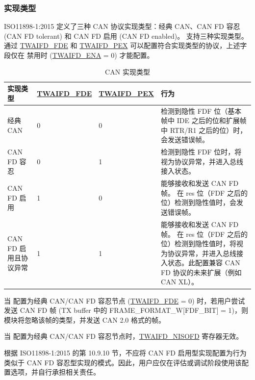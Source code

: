 \documentclass[main\_\_CN.tex]{subfiles}
\begin{document}
\subsubsection{实现类型}

ISO11898-1:2015 定义了三种 CAN 协议实现类型：经典 CAN、CAN FD 容忍 (CAN FD tolerant) 和 CAN FD 启用 (CAN FD enabled)。\modulename{} 支持三种实现类型。通过 \hyperref[fielddesc:TWAIFDFDE]{TWAIFD\_FDE} 和 \hyperref[fielddesc:TWAIFDPEX]{TWAIFD\_PEX} 可以配置符合实现类型的协议，上述字段仅在 \modulename{} 禁用时 (\hyperref[fielddesc:TWAIFDENA]{TWAIFD\_ENA} = 0) 才能配置。

\begin{table}[H]
    \centering
    \caption{CAN 实现类型}
    \label{tab:twai-func-can-implt-type}
    \begin{tabular}{ |m{2.5cm}|m{1.5cm}|m{1.5cm}|m{9.2cm}| }
    \hline
    \rowcolor{lightgray}
    \textbf{实现类型} & \textbf{\hyperref[fielddesc:TWAIFDFDE]{TWAIFD\newline \_FDE}} & \textbf{\hyperref[fielddesc:TWAIFDPEX]{TWAIFD\newline \_PEX}} &   \textbf{行为} \\\hline

    经典 CAN & 0 & 0 & \modulename{} 检测到隐性 FDF 位（基本帧中 IDE 之后的位和扩展帧中 RTR/R1 之后的位）时，会发送错误帧。\\\hline
    CAN FD 容忍 & 0 & 1 & \modulename{} 检测到隐性 FDF 位时，将视为协议异常，并进入总线接入状态。\\\hline
    CAN FD 启用 & 1 & 0 & \modulename{} 能够接收和发送 CAN FD 帧。\modulename{} 在 res 位（FDF 之后的位）检测到隐性值时，会发送错误帧。\\\hline
    CAN FD 启用且协议异常 & 1 & 1 & \modulename{} 能够接收和发送 CAN FD 帧。\modulename{} 在 res 位（FDF 之后的位）检测到隐性值时，将视为协议异常，并进入总线接入状态。此配置兼容 CAN FD 协议的未来扩展（例如 CAN XL）。\\\hline
    \end{tabular}
\end{table}

当 \modulename{} 配置为经典 CAN/CAN FD 容忍节点 (\hyperref[fielddesc:TWAIFDFDE]{TWAIFD\_FDE} = 0) 时，若用户尝试发送 CAN FD 帧 (TX buffer 中的 FRAME\_FORMAT\_W[FDF\_BIT] = 1)，则模块将忽略该帧的类型，并发送 CAN 2.0 格式的帧。

当 \modulename{} 配置为经典 CAN/CAN FD 容忍节点时，\hyperref[fielddesc:TWAIFDNISOFD]{TWAIFD\_NISOFD} 寄存器无效。

根据 ISO11898-1:2015 的第 10.9.10 节，不应将 CAN FD 启用型实现配置为行为类似于 CAN FD 容忍型实现的模式。因此，用户应仅在评估或调试阶段使用该配置选项，并自行承担相关责任。
\end{document}
